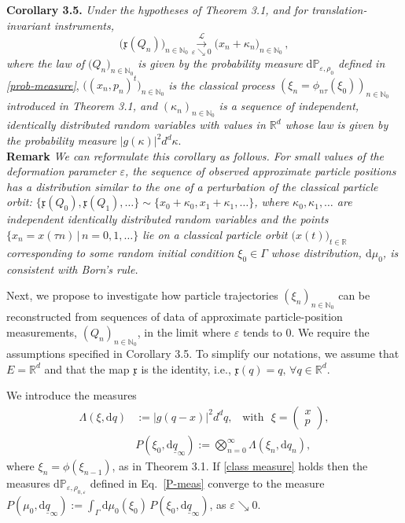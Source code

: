 \documentclass[12pt]{article}
\begin{document}
\vspace{0.2cm}
\noindent
{\bf{Corollary 3.5.}}\label{cor:translation_inv}
 \textit{Under the hypotheses of Theorem 3.1, and for translation-invariant instruments,}
$$\big(\mathfrak{x}(Q_n)\big)_{n\in \mathbb{N}_0} \overset{\mathcal{L}}{\underset{\varepsilon \searrow 0}{\longrightarrow}}
\big(x_n + \kappa_n \big)_{n\in \mathbb{N}_0}\,,$$
\textit{where the law of} $\big(Q_n\big)_{n\in \mathbb{N}_0}$ \textit{is given by the probability measure} 
$\text{d}\mathbb{P}_{\varepsilon, \rho_0}$ \textit{defined in \eqref{prob-measure}}, 
$\big((x_n, p_n)^{t}\big)_{n\in \mathbb{N}_0}$ \textit{is the classical process} 
$(\xi_n=\phi_{n\tau}(\xi_0))_{n\in \mathbb{N}_0}$ \textit{introduced in Theorem 3.1, and} 
$(\kappa_n)_{n \in \mathbb{N}_0}$ \textit{is a sequence of independent, 
identically distributed random variables with values in $\mathbb{R}^{d}$ whose law is given by the probability measure} 
$\big| g(\kappa) \big|^{2} d^{d}\kappa$.\\

\smallskip\noindent
{\bf{Remark}} \textit{We can reformulate this corollary as follows. For small values of the deformation 
parameter $\varepsilon$, the sequence of observed approximate particle positions has a distribution 
similar to the one of a perturbation of the classical particle orbit:
$\big\{\mathfrak{x}(Q_0), \mathfrak{x}(Q_1), \dots\big\}\sim\big\{x_0 + \kappa_0, x_1 + \kappa_1, \dots\big\}$,
where $\kappa_0, \kappa_1, \dots $ are independent identically distributed random variables and the points 
$\big\{x_n=x(\tau n)\,\vert\, n=0,1, \dots\big\}$ lie on a classical 
particle orbit $\big(x(t)\big)_{ t\in \mathbb{R}}$ corresponding to some random initial condition $\xi_0\in \Gamma$ 
whose distribution, $\text{d}\mu_0$, is consistent with Born's rule.}

\bigskip
Next, we propose to investigate how particle trajectories $(\xi_n)_{n\in \mathbb{N}_0}$ can be reconstructed 
from sequences of data of approximate particle-position measurements, $(Q_n)_{n\in \mathbb{N}_0}$, in the 
limit where $\varepsilon$ tends to 0. We require the assumptions specified in Corollary 3.5. To simplify our 
notations, we assume that $E= \mathbb{R}^{d}$ and that the map $\mathfrak{x}$ is the identity, i.e., 
$\mathfrak{x}(q)=q, \, \forall q \in \mathbb{R}^{d}$. 

We introduce the measures
\begin{align}\label{mu measure}
\Lambda(\xi, \text{d}q)&:= \big| g(q-x) \big|^{2} d^{d}q, \,\,\,\text{ with }\,\, \xi=\begin{pmatrix} x\\p \end{pmatrix},\\ 
\label{P measure}
&P(\xi_0, \text{d}\underline{q}_{\infty}):= \bigotimes_{n=0}^{\infty} \Lambda(\xi_n, \text{d}q_n), 
\end{align}
where $\xi_n = \phi(\xi_{n-1})$, as in Theorem 3.1. If \eqref{class measure} holds then the measures $\text{d}\mathbb{P}_{\varepsilon, \rho_{0, \varepsilon}}$ 
defined in Eq.~\eqref{P-meas} converge to the measure $P(\mu_{0}, \text{d}\underline{q}_{\infty}):= 
\int_{\Gamma} \text{d}\mu_{0}(\xi_0)\, P(\xi_0, \text{d}\underline{q}_{\infty})$, as $\varepsilon \searrow 0$.
\end{document}
